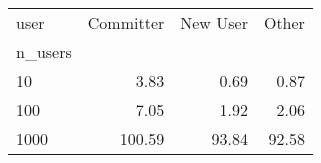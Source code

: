 \begin{tabular}{lrrr}
\toprule
user & Committer & New User & Other \\
n_users &  &  &  \\
\midrule
10 & 3.83 & 0.69 & 0.87 \\
100 & 7.05 & 1.92 & 2.06 \\
1000 & 100.59 & 93.84 & 92.58 \\
\bottomrule
\end{tabular}
